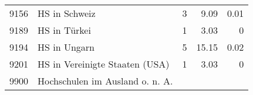 \begin{longtable}{lXrrr}
     9156 &
     \multicolumn{1}{X}{ HS in Schweiz   } &


       \num{3} &
       \num[round-mode=places,round-precision=2]{9,09} &
         \num[round-mode=places,round-precision=2]{0,01} \\

     9189 &
     \multicolumn{1}{X}{ HS in Türkei   } &


       \num{1} &
       \num[round-mode=places,round-precision=2]{3,03} &
         \num[round-mode=places,round-precision=2]{0} \\

     9194 &
     \multicolumn{1}{X}{ HS in Ungarn   } &


       \num{5} &
       \num[round-mode=places,round-precision=2]{15,15} &
         \num[round-mode=places,round-precision=2]{0,02} \\

     9201 &
     \multicolumn{1}{X}{ HS in Vereinigte Staaten (USA)   } &


       \num{1} &
       \num[round-mode=places,round-precision=2]{3,03} &
         \num[round-mode=places,round-precision=2]{0} \\

     9900 &
     \multicolumn{1}{X}{ Hochschulen im Ausland o. n. A.   } &



\end{longtable}

